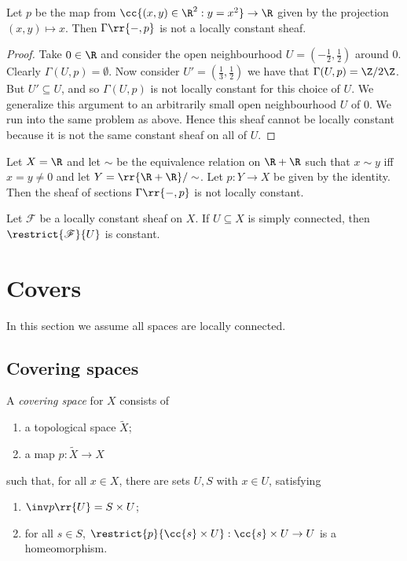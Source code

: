 \documentclass{article}
\begin{document}
\begin{example}
  Let $p$ be the map from $\cc{(x, y) \in \R^2 : y = x^2} \to \R$ given
  by the projection $(x, y) \mapsto x$. Then $\Gamma\rr{-,p}$ is not a locally constant sheaf.
  \begin{proof}
    Take $0 \in \R$ and consider the open neighbourhood $U = (-\frac{1}{2}, \frac{1}{2})$ around $0$.
    Clearly $\Gamma(U, p) = \emptyset$. Now consider $U' = (\frac{1}{3}, \frac{1}{2})$
    we have that $\Gamma(U, p) = \Z/2\Z$. But $U' \subseteq U$,
    and so $\Gamma(U,p)$ is not locally constant for this choice of $U$.
    We generalize this argument to an arbitrarily small open neighbourhood $U$ of $0$.
    We run into the same problem as above. Hence this sheaf cannot be locally
    constant because it is not the same constant sheaf on all of $U$.
  \end{proof}
\end{example}

\begin{example}
  Let $X=\R$ and let $\sim$ be the equivalence relation on $\R+\R$ such that
  $x\sim y$ iff $x=y\neq 0$ and let $Y=\rr{\R+\R}/\sim$. Let $p:Y\to X$ be
  given by the identity. Then the sheaf of sections $\Gamma\rr{-,p}$
  is not locally constant.
\end{example}

\begin{theorem}\label{thm:locally_constant_simply_connected}
  Let $\mathscr F$ be a locally constant sheaf on $X$. If $U\subseteq X$ is
  simply connected, then $\restrict{\mathscr F}{U}$ is constant.
\end{theorem}

\section{Covers}\label{sec:covering_space}
In this section we assume all spaces are locally connected.

\subsection{Covering spaces}

\begin{definition}
  A \emph{covering space} for $X$ consists of
  \begin{enumerate}
    \item a topological space $\tilde X$;
    \item a map $p:\tilde X\to X$
  \end{enumerate}
  such that, for all $x\in X$, there are sets $U,S$ with $x\in U$,
  satisfying
  \begin{enumerate}
    \item $\inv p\rr{U}=S\times U$;
    \item for all $s\in S$, $\restrict{p}{\cc{s}\times U}:\cc{s}\times U\to U$ is a
      homeomorphism.
  \end{enumerate}
\end{definition}
\end{document}
